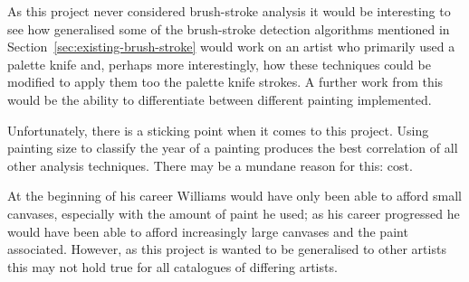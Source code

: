 As this project never considered brush-stroke analysis it would be interesting to see how 
generalised some of the brush-stroke detection algorithms mentioned in 
Section~\ref{sec:existing-brush-stroke} would work on an artist who primarily used a palette knife and,
perhaps more interestingly, how these techniques could be modified to apply them too the palette 
knife strokes. A further work from this would be the ability to differentiate between different
painting implemented.


Unfortunately, there is a sticking point when it comes to this project. Using painting size to 
classify the year of a painting produces the best correlation of all other analysis techniques.
There may be a mundane reason for this: cost.

At the beginning of his career Williams would have only been able to afford small canvases, 
especially with the amount of paint he used; as his career progressed he would have been able
to afford increasingly large canvases and the paint associated. However, as this project is wanted
to be generalised to other artists this may not hold true for all catalogues of differing artists.
